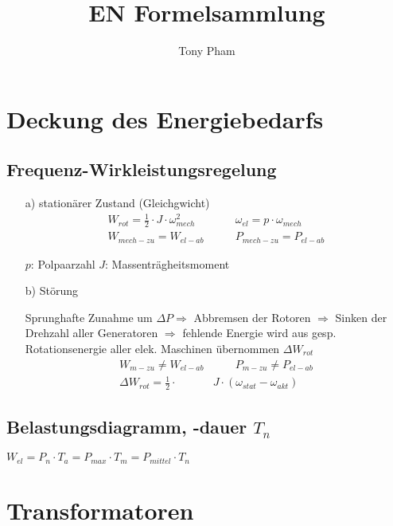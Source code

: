 \documentclass[a4paper,11pt]{article}
\title{EN Formelsammlung}
\author{Tony Pham}
\begin{document}
\maketitle
\tableofcontents
\twocolumn

\section{Deckung des Energiebedarfs}
	\subsection{Frequenz-Wirkleistungsregelung}

	\begin{enumerate}
		\item[a)]{stationärer Zustand (Gleichgwicht)}
		\begin{align*}
			 W_{rot} = \frac{1}{2} \cdot J \cdot \omega_{mech} ^{2} &\qquad
			 \omega_{el} = p  \cdot \omega_{mech} \\
			 W_{mech-zu} = W_{el-ab} &\qquad
			 P_{mech-zu} = P_{el-ab}
		\end{align*}

		$p$: Polpaarzahl \quad
		$J$: Massenträgheitsmoment
		
		\item[b)]{Störung}
		
		Sprunghafte Zunahme um $ \Delta P \Rightarrow$ 
		Abbremsen der Rotoren $\Rightarrow$ Sinken der Drehzahl aller Generatoren
		$\Rightarrow$ fehlende Energie wird aus gesp. Rotationsenergie aller elek.
		Maschinen übernommen $\Delta W_{rot}$
		\begin{align*}
			W_{m-zu} \neq W_{el-ab} &\qquad 
			P_{m-zu} \neq P_{el-ab} \\
			\Delta W_{rot} = \frac{1}{2} \cdot & J \cdot (\omega_{stat} - \omega_{akt})
		\end{align*}
	\end{enumerate}

	\subsection{Belastungsdiagramm, -dauer $T_{n}$}

	$W_{el} = P_{n} \cdot T_{a} = P_{max} \cdot T_{m} = P_{mittel} \cdot T_{n}$

\section{Transformatoren}
\end{document}
